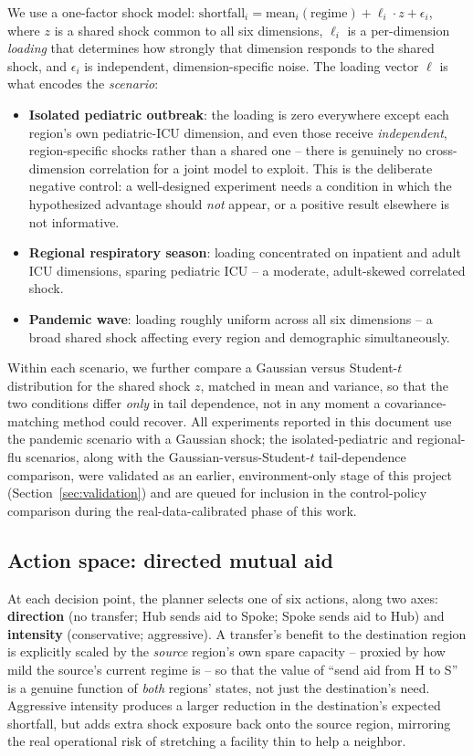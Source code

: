 \documentclass[11pt]{article}
\begin{document}
We use a one-factor shock model: $\text{shortfall}_i = \text{mean}_i(\text{regime}) + \ell_i \cdot z + \epsilon_i$, where $z$ is a shared shock common to all six dimensions, $\ell_i$ is a per-dimension \emph{loading} that determines how strongly that dimension responds to the shared shock, and $\epsilon_i$ is independent, dimension-specific noise. The loading vector $\ell$ is what encodes the \emph{scenario}:
\begin{itemize}[leftmargin=*]
\item \textbf{Isolated pediatric outbreak}: the loading is zero everywhere except each region's own pediatric-ICU dimension, and even those receive \emph{independent}, region-specific shocks rather than a shared one -- there is genuinely no cross-dimension correlation for a joint model to exploit. This is the deliberate negative control: a well-designed experiment needs a condition in which the hypothesized advantage should \emph{not} appear, or a positive result elsewhere is not informative.
\item \textbf{Regional respiratory season}: loading concentrated on inpatient and adult ICU dimensions, sparing pediatric ICU -- a moderate, adult-skewed correlated shock.
\item \textbf{Pandemic wave}: loading roughly uniform across all six dimensions -- a broad shared shock affecting every region and demographic simultaneously.
\end{itemize}
Within each scenario, we further compare a Gaussian versus Student-$t$ distribution for the shared shock $z$, matched in mean and variance, so that the two conditions differ \emph{only} in tail dependence, not in any moment a covariance-matching method could recover. All experiments reported in this document use the pandemic scenario with a Gaussian shock; the isolated-pediatric and regional-flu scenarios, along with the Gaussian-versus-Student-$t$ tail-dependence comparison, were validated as an earlier, environment-only stage of this project (Section~\ref{sec:validation}) and are queued for inclusion in the control-policy comparison during the real-data-calibrated phase of this work.

\subsection{Action space: directed mutual aid}
At each decision point, the planner selects one of six actions, along two axes: \textbf{direction} (no transfer; Hub sends aid to Spoke; Spoke sends aid to Hub) and \textbf{intensity} (conservative; aggressive). A transfer's benefit to the destination region is explicitly scaled by the \emph{source} region's own spare capacity -- proxied by how mild the source's current regime is -- so that the value of ``send aid from H to S'' is a genuine function of \emph{both} regions' states, not just the destination's need. Aggressive intensity produces a larger reduction in the destination's expected shortfall, but adds extra shock exposure back onto the source region, mirroring the real operational risk of stretching a facility thin to help a neighbor.
\end{document}
